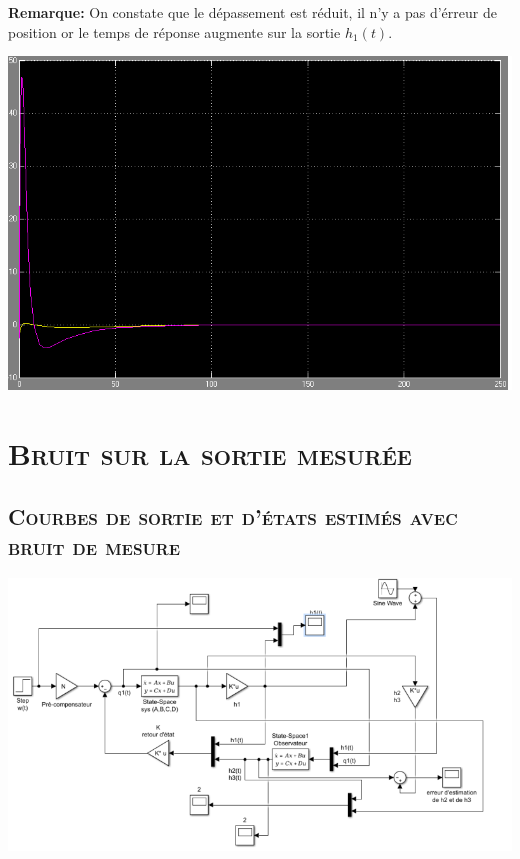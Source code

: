 		    \textbf{Remarque:} On constate que le dépassement est réduit, il n'y a pas d'érreur de position or le temps de réponse augmente sur la sortie $h_1(t)$.\\ 
		
		\begin{center}
		\includegraphics[scale=0.5]{errorcondi.PNG} 
		\label{fig7}
		\end{center}		
		
		
		\section{\textsc {Bruit sur la sortie mesurée}}
		
			\subsection{\textsc {Courbes de sortie et d'états estimés avec bruit de mesure}}
		
		\begin{center}
		\includegraphics[scale=0.5]{bloc2.png} 
		\label{fig10}
		\end{center}		
		
